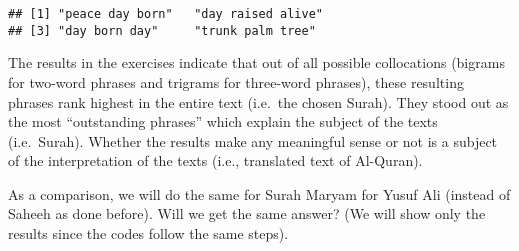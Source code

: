 \documentclass[
]{article}
\newenvironment{Shaded}{\begin{snugshade}}{\end{snugshade}}
\newcommand{\AttributeTok}[1]{\textcolor[rgb]{0.13,0.29,0.53}{#1}}
\newcommand{\ConstantTok}[1]{\textcolor[rgb]{0.56,0.35,0.01}{#1}}
\newcommand{\FunctionTok}[1]{\textcolor[rgb]{0.13,0.29,0.53}{\textbf{#1}}}
\newcommand{\NormalTok}[1]{#1}
\newcommand{\OtherTok}[1]{\textcolor[rgb]{0.56,0.35,0.01}{#1}}
\newcommand{\SpecialCharTok}[1]{\textcolor[rgb]{0.81,0.36,0.00}{\textbf{#1}}}
\newcommand{\StringTok}[1]{\textcolor[rgb]{0.31,0.60,0.02}{#1}}
\begin{document}
\begin{verbatim}
## [1] "peace day born"   "day raised alive"
## [3] "day born day"     "trunk palm tree"
\end{verbatim}

\normalsize

The results in the exercises indicate that out of all possible collocations (bigrams for two-word phrases and trigrams for three-word phrases), these resulting phrases rank highest in the entire text (i.e.~the chosen Surah). They stood out as the most ``outstanding phrases'' which explain the subject of the texts (i.e.~Surah). Whether the results make any meaningful sense or not is a subject of the interpretation of the texts (i.e., translated text of Al-Quran).

As a comparison, we will do the same for Surah Maryam for Yusuf Ali (instead of Saheeh as done before). Will we get the same answer? (We will show only the results since the codes follow the same steps).

\footnotesize

\begin{Shaded}
\end{Shaded}

\normalsize
\end{document}
